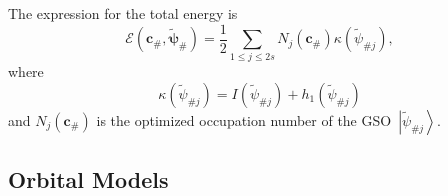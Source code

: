 \documentclass[aps,preprint]{revtex4}%
\begin{document}
The expression for the total energy is
\begin{equation}
\mathcal{E}\left(  \boldsymbol{c}_{\#},\boldsymbol{\tilde{\psi}}_{\#}\right)
=\frac{1}{2}\sum_{1\leq j\leq2s}N_{j}\left(  \boldsymbol{c}_{\#}\right)
\kappa\left(  \tilde{\psi}_{\#j}\right)  , \label{OETenergy}%
\end{equation}
where
\begin{equation}
\kappa\left(  \tilde{\psi}_{\#j}\right)  =I\left(  \tilde{\psi}_{\#j}\right)
+h_{1}\left(  \tilde{\psi}_{\#j}\right)  \label{kappa}%
\end{equation}
and $N_{j}\left(  \boldsymbol{c}_{\#}\right)  $ is the optimized occupation
number of the GSO\ $\left\vert \tilde{\psi}_{\#j}\right\rangle .$

\subsection{Orbital Models\label{OrbModel}}
\end{document}
